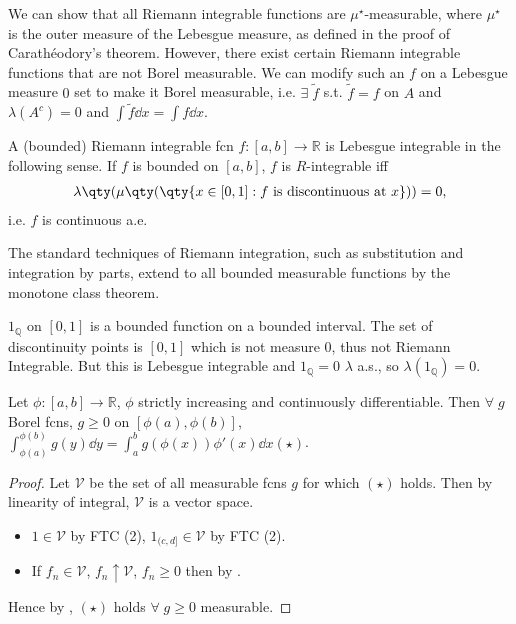 \begin{remark}
	We can show that all Riemann integrable functions are $\mu^\star$-measurable, where $\mu^\star$ is the outer measure of the Lebesgue measure, as defined in the proof of Carath\'eodory's theorem.
	However, there exist certain Riemann integrable functions that are not Borel measurable.
	We can modify such an $f$ on a Lebesgue measure $0$ set to make it Borel measurable, i.e. $\exists \; \widetilde f$ s.t. $\widetilde{f} = f$ on $A$ and $\lambda(A^c) = 0$ and $\int \widetilde{f} \dd{x} = \int f \dd{x}$.

	A (bounded) Riemann integrable fcn $f : [a, b] \to \mathbb{R}$ is Lebesgue integrable in the following sense.
	If $f$ is bounded on $[a, b]$, $f$ is $R$-integrable iff
	\begin{align*}
		\lambda\qty(\mu\qty(\qty{x \in [0,1] : f \text{ is discontinuous at } x})) = 0,
	\end{align*} i.e. $f$ is continuous a.e.

	The standard techniques of Riemann integration, such as substitution and integration by parts, extend to all bounded measurable functions by the monotone class theorem.
\end{remark}

\begin{example}
	$1_\mathbb{Q}$ on $[0, 1]$ is a bounded function on a bounded interval.
	The set of discontinuity points is $[0, 1]$ which is not measure $0$, thus not Riemann Integrable.
	But this is Lebesgue integrable and $1_\mathbb{Q} = 0$ $\lambda$ a.s., so $\lambda(1_\mathbb{Q}) = 0$.
\end{example}

\begin{theorem}
	Let $\phi : [a, b] \to \mathbb{R}$, $\phi$ strictly increasing and continuously differentiable.
	Then $\forall \; g$ Borel fcns, $g \geq 0$ on $[\phi(a), \phi(b)]$, $\int_{\phi(a)}^{\phi(b)} g(y) \dd{y} = \int_a^b g(\phi(x)) \phi'(x) \dd{x} (\star)$.
\end{theorem}

\begin{proof}
	Let $\mathcal{V}$ be the set of all measurable fcns $g$ for which $(\star)$ holds.
	Then by linearity of integral, $\mathcal{V}$ is a vector space.
	\begin{itemize}
		\item $1 \in \mathcal{V}$ by FTC (2), $1_{(c, d]} \in \mathcal{V}$ by FTC (2).
		\item If $f_n \in \mathcal{V}$, $f_n \uparrow \mathcal{V}$, $f_n \geq 0$ then by .
	\end{itemize}
	Hence by , $(\star)$ holds $\forall \; g \geq 0$ measurable.
\end{proof}

